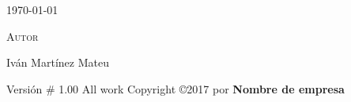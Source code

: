 \documentclass[a4paper,12pt]{book}
\begin{document}
\begin{titlepage}
\begin{large}
\begin{minipage}{10cm}
			\today \\
		\end{minipage}
		\hfill
		\begin{minipage}{10cm}
			\textsc{Autor}
				
			Iván Martínez Mateu \\
		\end{minipage}
	\end{large}
	\vspace*{0.3in}
	\begin{center}
		Versión \# 1.00
		All work Copyright ©2017 por \textbf{Nombre de empresa} 
	\end{center}
	
\end{titlepage}

\frontmatter
\tableofcontents
\listoffigures
\listoftables

\mainmatter
















\backmatter
\end{document}
